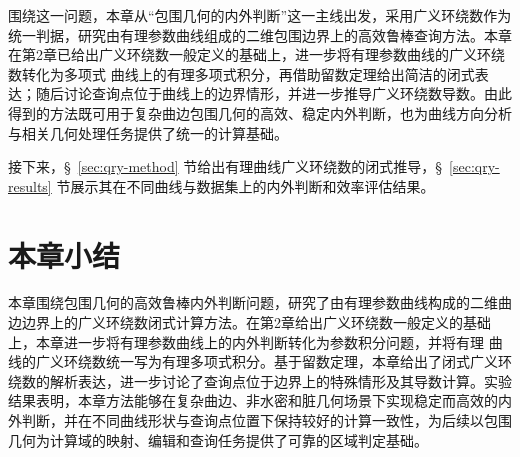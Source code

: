 围绕这一问题，本章从“包围几何的内外判断”这一主线出发，采用广义环绕数作为统一判据，研究由有理参数曲线组成的二维包围边界上的高效鲁棒查询方法。本章在第2章已给出广义环绕数一般定义的基础上，进一步将有理参数曲线的广义环绕数转化为多项式 \Bezier 曲线上的有理多项式积分，再借助留数定理给出简洁的闭式表达；随后讨论查询点位于曲线上的边界情形，并进一步推导广义环绕数导数。由此得到的方法既可用于复杂曲边包围几何的高效、稳定内外判断，也为曲线方向分析与相关几何处理任务提供了统一的计算基础。

接下来，\S~\ref{sec:qry-method} 节给出有理曲线广义环绕数的闭式推导，\S~\ref{sec:qry-results} 节展示其在不同曲线与数据集上的内外判断和效率评估结果。




\section{本章小结}\label{sec:chap3-query-conclusion}
本章围绕包围几何的高效鲁棒内外判断问题，研究了由有理参数曲线构成的二维曲边边界上的广义环绕数闭式计算方法。在第2章给出广义环绕数一般定义的基础上，本章进一步将有理参数曲线上的内外判断转化为参数积分问题，并将有理 \Bezier 曲线的广义环绕数统一写为有理多项式积分。基于留数定理，本章给出了闭式广义环绕数的解析表达，进一步讨论了查询点位于边界上的特殊情形及其导数计算。实验结果表明，本章方法能够在复杂曲边、非水密和脏几何场景下实现稳定而高效的内外判断，并在不同曲线形状与查询点位置下保持较好的计算一致性，为后续以包围几何为计算域的映射、编辑和查询任务提供了可靠的区域判定基础。
